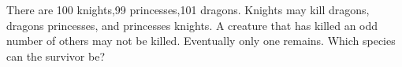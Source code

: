 There are 100 knights,99 princesses,101 dragons. Knights may kill dragons, dragons princesses, and princesses knights. A creature that has killed an odd number of others may not be killed. Eventually only one remains. Which species can the survivor be?
